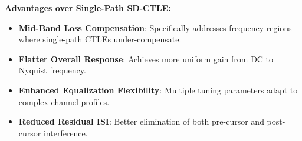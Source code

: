 \textbf{Advantages over Single-Path SD-CTLE:}
\begin{itemize}
    \item \textbf{Mid-Band Loss Compensation}: Specifically addresses frequency regions where single-path CTLEs under-compensate.
    \item \textbf{Flatter Overall Response}: Achieves more uniform gain from DC to Nyquist frequency.
    \item \textbf{Enhanced Equalization Flexibility}: Multiple tuning parameters adapt to complex channel profiles.
    \item \textbf{Reduced Residual ISI}: Better elimination of both pre-cursor and post-cursor interference.
\end{itemize}

\newpage